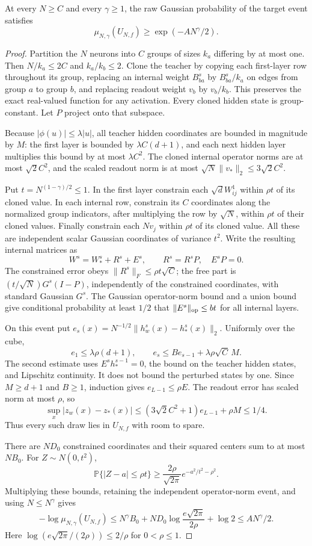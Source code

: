 \begin{proposition}
\label{prop:unbounded-target-mass}
At every $N\ge C$ and every $\gamma\ge1$, the raw Gaussian probability
of the target event satisfies
\[
 \mu_{N,\gamma}(U_{N,f})\ge \exp(-AN^\gamma/2).
\]
\end{proposition}
\begin{proof}
Partition the $N$ neurons into $C$ groups of sizes $k_a$ differing by at
most one. Then $N/k_a\le2C$ and $k_a/k_b\le2$. Clone the teacher by
copying each first-layer row throughout its group, replacing an internal
weight $B^s_{ba}$ by $B^s_{ba}/k_a$ on edges from group $a$ to group $b$,
and replacing readout weight $v_b$ by $v_b/k_b$. This preserves the exact
real-valued function for any activation. Every cloned hidden state is
group-constant. Let $P$ project onto that subspace.

Because $|\phi(u)|\le\lambda|u|$, all teacher hidden coordinates are
bounded in magnitude by $M$: the first layer is bounded by
$\lambda C(d+1)$, and each next hidden layer multiplies this bound by at
most $\lambda C^2$. The cloned internal operator norms are at most
$\sqrt2 C^2$, and the scaled readout norm is at most
$\sqrt N\|v_*\|_2\le3\sqrt2 C^2$.

Put $t=N^{(1-\gamma)/2}\le1$. In the first layer constrain each
$\sqrt d W^1_{ij}$ within $\rho t$ of its cloned value. In each internal
row, constrain its $C$ coordinates along the normalized group indicators,
after multiplying the row by $\sqrt N$, within $\rho t$ of their cloned
values. Finally constrain each $Nv_j$ within $\rho t$ of its cloned
value. All these are independent scalar Gaussian coordinates of variance
$t^2$. Write the resulting internal matrices as
\[
 W^s=W_*^s+R^s+E^s,\qquad R^s=R^sP,\quad E^sP=0.
\]
The constrained error obeys $\|R^s\|_F\le\rho t\sqrt C$; the free
part is $(t/\sqrt N)G^s(I-P)$, independently of the constrained
coordinates, with standard Gaussian $G^s$. The Gaussian operator-norm
bound and a union bound give conditional probability at least $1/2$ that
$\|E^s\|_{\rm op}\le bt$ for all internal layers.

On this event put
$e_s(x)=N^{-1/2}\|h_w^s(x)-h_*^s(x)\|_2$. Uniformly over the cube,
\[
 e_1\le\lambda\rho(d+1),\qquad
 e_s\le B e_{s-1}+\lambda\rho\sqrt C\,M.
\]
The second estimate uses $E^sh_*^{s-1}=0$, the bound on the teacher hidden
states, and Lipschitz continuity. It does not bound the perturbed states
by one. Since $M\ge d+1$ and $B\ge1$, induction gives
$e_{L-1}\le\rho E$. The readout error has scaled norm at most $\rho$,
so
\[
 \sup_x|z_w(x)-z_*(x)|
 \le (3\sqrt2 C^2+1)e_{L-1}+\rho M\le1/4.
\]
Thus every such draw lies in $U_{N,f}$ with room to spare.

There are $ND_0$ constrained coordinates and their squared centers sum
to at most $NB_0$. For $Z\sim N(0,t^2)$,
\[
 \mathbb P\{|Z-a|\le\rho t\}
 \ge\frac{2\rho}{\sqrt{2\pi}}e^{-a^2/t^2-\rho^2}.
\]
Multiplying these bounds, retaining the independent operator-norm event,
and using $N\le N^\gamma$ gives
\[
 -\log\mu_{N,\gamma}(U_{N,f})
 \le N^\gamma B_0+ND_0\log\frac{e\sqrt{2\pi}}{2\rho}+\log2
 \le AN^\gamma/2.
\]
Here $\log(e\sqrt{2\pi}/(2\rho))\le2/\rho$ for $0<\rho\le1$.
\end{proof}

